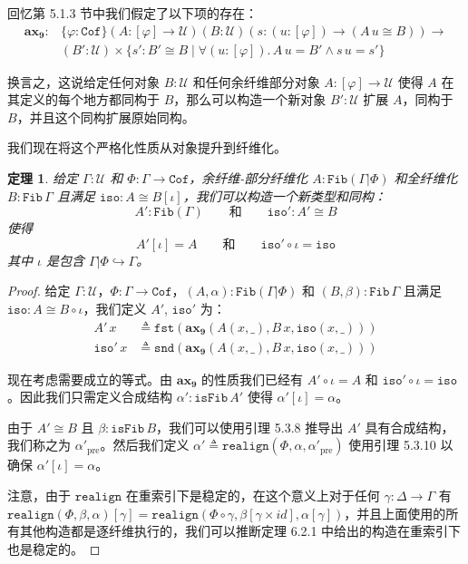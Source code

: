 \documentclass{ctexrep}
\theoremstyle{plain}
\newtheorem{theorem}{定理}[section]
\theoremstyle{definition}
\theoremstyle{remark}
\newcommand{\ax}[1]{\mathbf{ax_{#1}}}
\begin{document}
回忆第 5.1.3 节中我们假定了以下项的存在：
\begin{align*}
\ax{9} : &\{\varphi : \mathtt{Cof}\}(A : [\varphi] \to \mathcal{U})(B : \mathcal{U})(s : (u : [\varphi]) \to (A\,u \cong B)) \to \\
&(B' : \mathcal{U}) \times \{s' : B' \cong B \mid \forall(u : [\varphi]).\,A\,u = B' \land s\,u = s'\}
\end{align*}

换言之，这说给定任何对象 $B : \mathcal{U}$ 和任何余纤维部分对象 $A : [\varphi] \to \mathcal{U}$ 使得 $A$ 在其定义的每个地方都同构于 $B$，那么可以构造一个新对象 $B' : \mathcal{U}$ 扩展 $A$，同构于 $B$，并且这个同构扩展原始同构。

我们现在将这个严格化性质从对象提升到纤维化。

\begin{theorem}
给定 $\Gamma : \mathcal{U}$ 和 $\Phi : \Gamma \to \mathtt{Cof}$，余纤维-部分纤维化 $A : \mathtt{Fib}(\Gamma|\Phi)$ 和全纤维化 $B : \mathtt{Fib}\,\Gamma$ 且满足 $\mathtt{iso} : A \cong B[\iota]$，我们可以构造一个新类型和同构：
\[
A' : \mathtt{Fib}(\Gamma) \qquad \text{和} \qquad \mathtt{iso}' : A' \cong B
\]
使得
\[
A'[\iota] = A \qquad \text{和} \qquad \mathtt{iso}' \circ \iota = \mathtt{iso}
\]
其中 $\iota$ 是包含 $\Gamma|\Phi \hookrightarrow \Gamma$。
\end{theorem}

\begin{proof}
给定 $\Gamma : \mathcal{U}$，$\Phi : \Gamma \to \mathtt{Cof}$，$(A, \alpha) : \mathtt{Fib}(\Gamma|\Phi)$ 和 $(B, \beta) : \mathtt{Fib}\,\Gamma$ 且满足 $\mathtt{iso} : A \cong B \circ \iota$，我们定义 $A'$, $\mathtt{iso}'$ 为：
\begin{align*}
A'\,x &\triangleq \mathtt{fst}(\ax{9}(A(x, \_), B\,x, \mathtt{iso}(x, \_))) \\
\mathtt{iso}'\,x &\triangleq \mathtt{snd}(\ax{9}(A(x, \_), B\,x, \mathtt{iso}(x, \_)))
\end{align*}

现在考虑需要成立的等式。由 $\ax{9}$ 的性质我们已经有 $A' \circ \iota = A$ 和 $\mathtt{iso}' \circ \iota = \mathtt{iso}$。因此我们只需定义合成结构 $\alpha' : \mathtt{isFib}\,A'$ 使得 $\alpha'[\iota] = \alpha$。

由于 $A' \cong B$ 且 $\beta : \mathtt{isFib}\,B$，我们可以使用引理 5.3.8 推导出 $A'$ 具有合成结构，我们称之为 $\alpha'_{\mathrm{pre}}$。然后我们定义 $\alpha' \triangleq \mathtt{realign}(\Phi, \alpha, \alpha'_{\mathrm{pre}})$ 使用引理 5.3.10 以确保 $\alpha'[\iota] = \alpha$。

注意，由于 $\mathtt{realign}$ 在重索引下是稳定的，在这个意义上对于任何 $\gamma : \Delta \to \Gamma$ 有 $\mathtt{realign}(\Phi, \beta, \alpha)[\gamma] = \mathtt{realign}(\Phi \circ \gamma, \beta[\gamma \times  id ], \alpha[\gamma])$，并且上面使用的所有其他构造都是逐纤维执行的，我们可以推断定理 6.2.1 中给出的构造在重索引下也是稳定的。
\end{proof}
\end{document}
